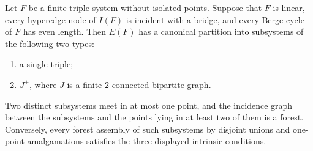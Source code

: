 
\begin{theorem}
\label{theorem-canonical-atom-normal-form}
Let $F$ be a finite triple system without isolated points. Suppose that $F$
is linear, every hyperedge-node of $I(F)$ is incident with a bridge, and every
Berge cycle of $F$ has even length. Then $E(F)$ has a canonical partition into
subsystems of the following two types:
\begin{enumerate}
\item a single triple;
\item $J^+$, where $J$ is a finite $2$-connected bipartite graph.
\end{enumerate}
Two distinct subsystems meet in at most one point, and the incidence graph
between the subsystems and the points lying in at least two of them is a
forest. Conversely, every forest assembly of such subsystems by disjoint
unions and one-point amalgamations satisfies the three displayed intrinsic
conditions.
\end{theorem}


